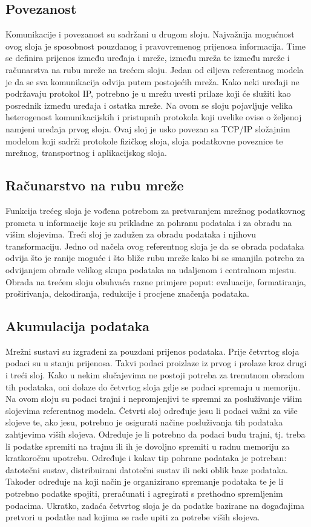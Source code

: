 \documentclass[times, utf8, diplomski]{fer}
\begin{document}
\subsection{Povezanost}
Komunikacije i povezanost su sadržani u drugom sloju. Najvažnija mogućnost ovog sloja je sposobnost pouzdanog i pravovremenog prijenosa informacija. Time se definira prijenos između uređaja i mreže, između mreža te između mreže i računarstva na rubu mreže  na trećem sloju. Jedan od ciljeva referentnog modela je da se sva komunikacija odvija putem postojećih mreža. Kako neki uređaji ne podržavaju protokol IP, potrebno je u mrežu uvesti prilaze  koji će služiti kao posrednik između uređaja i ostatka mreže. Na ovom se sloju pojavljuje velika heterogenost komunikacijskih i pristupnih protokola koji uvelike ovise o željenoj namjeni uređaja prvog sloja. Ovaj sloj je usko povezan sa TCP/IP složajnim modelom koji sadrži protokole fizičkog sloja, sloja podatkovne poveznice te mrežnog, transportnog i aplikacijskog sloja.

\subsection{Računarstvo na rubu mreže}
Funkcija trećeg sloja je vođena potrebom za pretvaranjem mrežnog podatkovnog prometa u informacije koje su prikladne za pohranu podataka i za obradu na višim slojevima. Treći sloj je zadužen za obradu podataka i njihovu transformaciju. Jedno od načela ovog referentnog sloja je da se obrada podataka odvija što je ranije moguće i što bliže rubu mreže kako bi se smanjila potreba za odvijanjem obrade velikog skupa podataka na udaljenom i centralnom mjestu. Obrada na trećem sloju obuhvaća razne primjere poput: evaluacije, formatiranja, proširivanja, dekodiranja, redukcije i procjene značenja podataka.

\subsection{Akumulacija podataka}
Mrežni sustavi su izgrađeni za pouzdani prijenos podataka. Prije četvrtog sloja podaci su u stanju prijenosa. Takvi podaci proizlaze iz prvog i prolaze kroz drugi i treći sloj. Kako u nekim slučajevima ne postoji potreba za trenutnom obradom tih podataka, oni dolaze do četvrtog sloja gdje se podaci spremaju u memoriju. Na ovom sloju su podaci trajni i nepromjenjivi te spremni za posluživanje višim slojevima referentnog modela. Četvrti sloj određuje jesu li podaci važni za više slojeve te, ako jesu, potrebno je osigurati načine posluživanja tih podataka zahtjevima viših slojeva. Određuje je li potrebno da podaci budu trajni, tj. treba li podatke spremiti na trajnu ili ih je dovoljno spremiti u radnu memoriju za kratkoročnu upotrebu. Određuje i kakav tip pohrane podataka je potreban: datotečni sustav, distribuirani datotečni sustav ili neki oblik baze podataka. Također određuje na koji način je organizirano spremanje podataka te je li potrebno podatke spojiti, preračunati i agregirati s prethodno spremljenim podacima. Ukratko, zadaća četvrtog sloja je da podatke bazirane na događajima pretvori u podatke nad kojima se rade upiti za potrebe viših slojeva.
\end{document}
